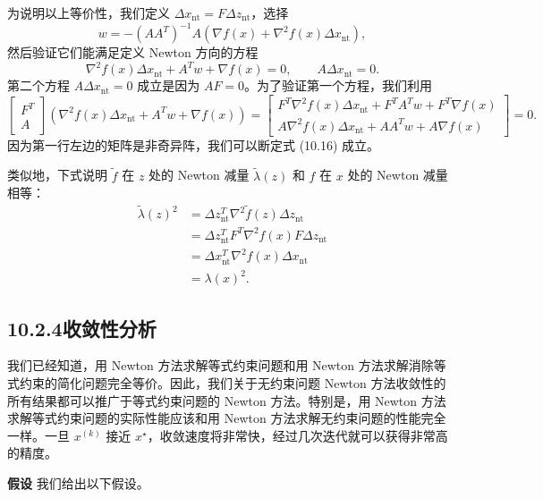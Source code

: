 \documentclass[UTF8, 12pt, fontset=fandol, oneside]{ctexart}
\begin{document}
为说明以上等价性，我们定义 $\Delta x_{\mathrm{nt}}=F\Delta z_{\mathrm{nt}}$，选择
\[
w=-(AA^T)^{-1}A\left(\nabla f(x)+\nabla^2 f(x)\Delta x_{\mathrm{nt}}\right),
\]
然后验证它们能满足定义 Newton 方向的方程
\begin{equation}
\nabla^2 f(x)\Delta x_{\mathrm{nt}}+A^Tw+\nabla f(x)=0,\qquad
A\Delta x_{\mathrm{nt}}=0.
\tag{10.16}
\end{equation}
第二个方程 $A\Delta x_{\mathrm{nt}}=0$ 成立是因为 $AF=0$。为了验证第一个方程，我们利用
\[
\begin{bmatrix}
F^T\\
A
\end{bmatrix}
\left(\nabla^2 f(x)\Delta x_{\mathrm{nt}}+A^Tw+\nabla f(x)\right)
=
\begin{bmatrix}
F^T\nabla^2 f(x)\Delta x_{\mathrm{nt}}+F^TA^Tw+F^T\nabla f(x)\\
A\nabla^2 f(x)\Delta x_{\mathrm{nt}}+AA^Tw+A\nabla f(x)
\end{bmatrix}
=0.
\]
因为第一行左边的矩阵是非奇异阵，我们可以断定式 (10.16) 成立。

类似地，下式说明 $\tilde{f}$ 在 $z$ 处的 Newton 减量 $\tilde{\lambda}(z)$ 和 $f$ 在 $x$ 处的 Newton 减量相等：
\[
\begin{aligned}
\tilde{\lambda}(z)^2
&=\Delta z_{\mathrm{nt}}^T\nabla^2\tilde{f}(z)\Delta z_{\mathrm{nt}}\\
&=\Delta z_{\mathrm{nt}}^TF^T\nabla^2 f(x)F\Delta z_{\mathrm{nt}}\\
&=\Delta x_{\mathrm{nt}}^T\nabla^2 f(x)\Delta x_{\mathrm{nt}}\\
&=\lambda(x)^2.
\end{aligned}
\]

\subsection*{10.2.4\quad 收敛性分析}

我们已经知道，用 Newton 方法求解等式约束问题和用 Newton 方法求解消除等式约束的简化问题完全等价。因此，我们关于无约束问题 Newton 方法收敛性的所有结果都可以推广于等式约束问题的 Newton 方法。特别是，用 Newton 方法求解等式约束问题的实际性能应该和用 Newton 方法求解无约束问题的性能完全一样。一旦 $x^{(k)}$ 接近 $x^\star$，收敛速度将非常快，经过几次迭代就可以获得非常高的精度。

\noindent\textbf{假设}\quad
我们给出以下假设。
\end{document}
